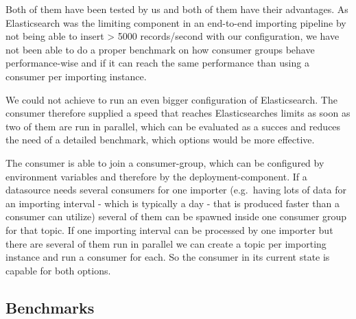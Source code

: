Both of them have been tested by us and both of them have their
advantages. As Elasticsearch was the limiting component in an end-to-end
importing pipeline by not being able to insert \textgreater{} 5000
records/second with our configuration, we have not been able to do a
proper benchmark on how consumer groups behave performance-wise and if
it can reach the same performance than using a consumer per importing
instance.

We could not achieve to run an even bigger configuration of
Elasticsearch. The consumer therefore supplied a speed that reaches
Elasticsearches limits as soon as two of them are run in parallel, which
can be evaluated as a succes and reduces the need of a detailed
benchmark, which options would be more effective.

The consumer is able to join a consumer-group, which can be configured
by environment variables and therefore by the deployment-component. If a
datasource needs several consumers for one importer (e.g.~having lots of
data for an importing interval - which is typically a day - that is
produced faster than a consumer can utilize) several of them can be
spawned inside one consumer group for that topic. If one importing
interval can be processed by one importer but there are several of them
run in parallel we can create a topic per importing instance and run a
consumer for each. So the consumer in its current state is capable for
both options.

\subsection{Benchmarks}\label{benchmarks}
